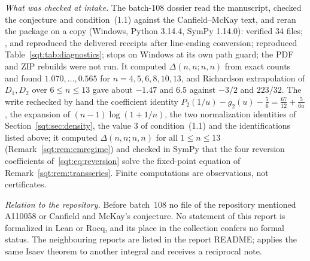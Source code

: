 \begin{writenote}
\emph{What was checked at intake.} The batch-108 dossier read the
manuscript, checked the conjecture and condition~(1.1) against the
Canfield--McKay text, and reran the package on a copy (Windows, Python
3.14.4, SymPy 1.14.0):  verified 34 files;
,  and
 reproduced the delivered receipts after line-ending
conversion;  reproduced
Table~\ref{sqt:tab:diagnostics};  stops on Windows
at its own path guard; the PDF and ZIP rebuilds were not run. It
computed $\Delta(n,n;n,n)$ from exact counts and found $1.070,\ldots,0.565$
for $n=4,5,6,8,10,13$, and Richardson extrapolation of $D_1,D_2$ over
$6\le n\le13$ gave about $-1.47$ and $6.5$ against $-3/2$ and $223/32$. The
write rechecked by hand the coefficient identity
$P_2(1/u)-g_2(u)-\tfrac56=\tfrac{67}{12}+\tfrac5{6u}$, the expansion of
$(n-1)\log(1+1/n)$, the two normalization identities of
Section~\ref{sqt:sec:density}, the value $3$ of condition~(1.1) and the
identifications listed above; it computed $\Delta(n,n;n,n)$ for all
$1\le n\le13$ (Remark~\ref{sqt:rem:cmregime}) and checked in SymPy that the
four reversion coefficients of~\eqref{sqt:eq:reversion} solve the
fixed-point equation of Remark~\ref{sqt:rem:transseries}. Finite
computations are observations, not certificates.

\emph{Relation to the repository.} Before batch~108 no file of the
repository mentioned A110058 or Canfield and McKay's conjecture. No
statement of this report is formalized in Lean or Rocq, and its place in the
collection confers no formal status. The neighbouring reports are listed in
the report README;  applies the same
Isaev theorem to another integral and receives a reciprocal note.
\end{writenote}
